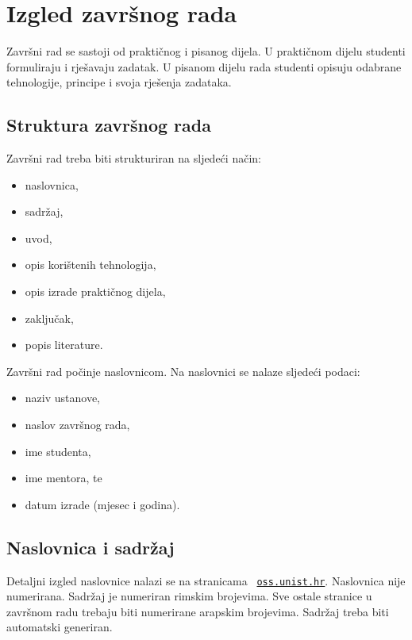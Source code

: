 \section{Izgled završnog rada}

Završni rad se sastoji od praktičnog i pisanog dijela. U praktičnom dijelu studenti formuliraju i rješavaju zadatak. U pisanom dijelu rada 
studenti opisuju odabrane tehnologije, principe i svoja rješenja zadataka.
\subsection{Struktura završnog rada}

Završni rad treba biti strukturiran na sljedeći način:
\begin{itemize}
 \item naslovnica,
 \item sadržaj,
 \item uvod,
 \item opis korištenih tehnologija,
 \item opis izrade praktičnog dijela,
 \item zaključak,
 \item popis literature.
\end{itemize}

Završni rad počinje naslovnicom. Na naslovnici se nalaze sljedeći podaci:
\begin{itemize}
 \item naziv ustanove,
 \item naslov završnog rada,
 \item ime studenta,
 \item ime mentora, te
 \item datum izrade (mjesec i godina).
\end{itemize}

\subsection{Naslovnica i sadržaj}
Detaljni izgled naslovnice nalazi se na stranicama ~\href{http://oss.unist.hr/index.php/odjel/propisi-i-dokumenti/243-pravilnik-o-izradi-i-obrani-zavrsnog-rada}{\texttt{oss.unist.hr}}.
Naslovnica nije numerirana.  
Sadržaj je numeriran rimskim brojevima. Sve ostale stranice u završnom radu trebaju biti numerirane arapskim brojevima. 
Sadržaj treba biti automatski generiran.

